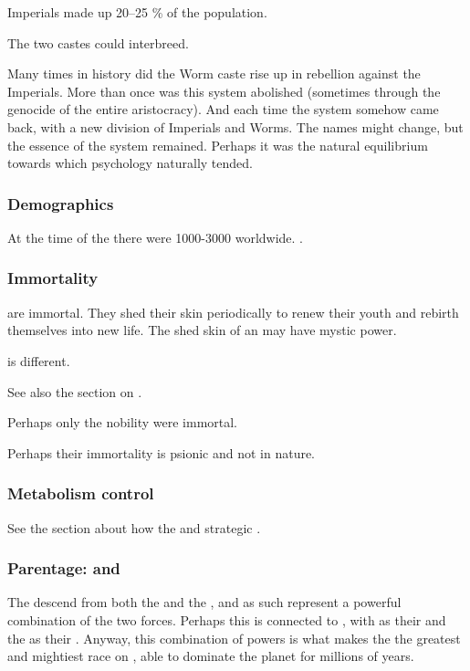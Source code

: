 Imperials made up 20--25 \% of the \ophidian population.

The two castes could interbreed.

Many times in \ophidian history did the Worm caste rise up in rebellion against the Imperials.
More than once was this system abolished (sometimes through the genocide of the entire aristocracy).
And each time the system somehow came back, with a new division of Imperials and Worms. 
The names might change, but the essence of the system remained.
Perhaps it was the natural equilibrium towards which \ophidian psychology naturally tended.





\subsubsection{Demographics}
At the time of the \thirdbanewar there were 1000-3000 \ophidians worldwide. 
.





\subsubsection{Immortality}
\Ophidians{} are immortal. They shed their skin periodically to renew their youth and rebirth themselves into new life. 
The shed skin of an \ophidian{} may have mystic power. 

 is different. 

See also the section on . 

Perhaps only the nobility were immortal. 

Perhaps their immortality is psionic and not  in nature. 





\subsubsection{Metabolism control}
See the section about how the \ophidians {} and strategic . 





\subsubsection{Parentage: \Voyagers and \xss}
The \ophidians{} descend from both the \voyagers{} and the \xss, and as such represent a powerful combination of the two forces. 
Perhaps this is connected to , with \xsic{} \Chaos{} as their  and the \voyagers{} as their . 
Anyway, this combination of powers is what makes the \ophidians{} the greatest and mightiest race on \Miith{}, able to dominate the planet for millions of years. 

